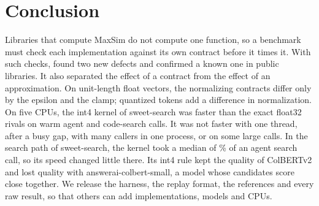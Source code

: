 \section{Conclusion}
\label{sec:conclusion}

Libraries that compute MaxSim do not compute one function, so a benchmark must check each implementation against its own contract before it times it.
With such checks, \benchname found two new defects and confirmed a known one in public libraries.
It also separated the effect of a contract from the effect of an approximation.
On unit-length float vectors, the normalizing contracts differ only by the epsilon and the clamp; quantized tokens add a difference in normalization.
On five CPUs, the int4 kernel of sweet-search was faster than the exact float32 rivals on warm agent and code-search calls.
It was not faster with one thread, after a busy gap, with many callers in one process, or on some large calls.
In the search path of sweet-search, the kernel took a median of \% of an agent search call, so its speed changed little there.
Its int4 rule kept the quality of ColBERTv2 and lost quality with answerai-colbert-small, a model whose candidates score close together.
We release the harness, the replay format, the references and every raw result, so that others can add implementations, models and CPUs.
